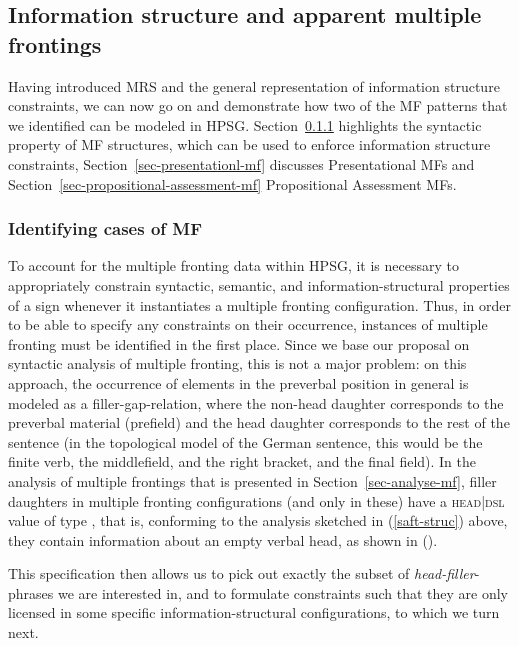 \begin{exe}
\begin{xlist}[iv.]
\begin{exe}
\begin{xlist}[iv.]
\begin{exe}
\begin{xlist}[iv.]
\subsection{Information structure and apparent multiple frontings}
\label{sec-inf-struc-and-mf}

Having introduced MRS and the general representation of information structure constraints, we can
now go on and demonstrate how two of the MF patterns that we identified can be modeled in
HPSG. Section~\ref{sec-identifying-mf} highlights the syntactic property of MF structures, which can
be used to enforce information structure constraints, Section~\ref{sec-presentationl-mf} discusses Presentational MFs
and Section~\ref{sec-propositional-assessment-mf} Propositional Assessment MFs.

\subsubsection{Identifying cases of MF}
\label{sec-identifying-mf}

To account for the multiple fronting data within HPSG, it is necessary to appropriately constrain syntactic, semantic, and information-structural properties of a sign whenever it instantiates a multiple fronting configuration. Thus, in order to be able to specify any constraints on their occurrence, instances of multiple fronting must be identified in the first place. Since we base our proposal on  syntactic analysis of multiple fronting, this is not a major
problem: on this approach, the occurrence of elements in the preverbal position in general is
modeled as a filler-gap-relation, where the non-head daughter corresponds to the preverbal material
(prefield) and the head daughter corresponds to the rest of the sentence (in the topological model
of the German sentence, this would be the finite verb, the middlefield, and the right bracket, and
the final field). In the analysis of multiple frontings that is presented in Section~\ref{sec-analyse-mf}, filler daughters in multiple fronting
configurations (and only in these) have a \textsc{head|dsl} value of type , that is,
conforming to the analysis sketched in (\ref{saft-struc}) above, they contain information about an
empty verbal head, as shown in ().


\ea
{}
\z
This specification then allows us to pick out exactly the subset of \textit{head-filler}-phrases we are interested in, and to formulate constraints such that they are only licensed in some specific information-structural configurations, to which we turn next.


\end{xlist}
\end{exe}
\end{xlist}
\end{exe}
\end{xlist}
\end{exe}
